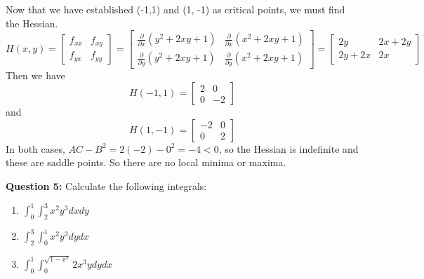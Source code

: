 \documentclass[10pt]{amsart}
\begin{document}
\begin{enumerate}
Now that we have established (-1,1) and (1, -1) as critical points, we must find the Hessian. 
\begin{equation*}
H(x,y) = \left[\begin{array}{rr}
f_{xx} & f_{xy}\\
f_{yx} & f_{yy} \end{array}\right]
= \left[\begin{array}{rr}
\frac{\partial}{\partial x}(y^2 + 2xy +1) & \frac{\partial}{\partial x}(x^2+2xy+1)\\
\frac{\partial}{\partial y}(y^2 +2xy+1) &\frac{\partial}{\partial y}(x^2 +2xy+1) \end{array}\right]
= \left[\begin{array}{rr}
2y & 2x + 2y \\
2y + 2x & 2x \end{array}\right]
\end{equation*}
Then we have $$H(-1,1) = \left[\begin{array}{rr}
2  & 0 \\
0 & -2 \end{array}\right] $$ and $$H(1,-1) = \left[\begin{array}{rr}
-2 & 0 \\
0 & 2 \end{array}\right] $$
In both cases, $AC -  B^2 = 2(-2)-0^2 = -4 < 0$, so the Hessian is indefinite and these are saddle points. So there are no local minima or maxima.
\end{enumerate}
\medskip

\textbf{Question 5:} Calculate the following integrals:
\begin{enumerate}
\item $\int_{0}^1 \int_{2}^{3} x^2y^3 dxdy$
\item $\int_{2}^{3} \int_{0}^1 x^2y^3 dydx$
\item $\int_{0}^1 \int_0^{\sqrt{1-x^2}} 2x^3ydydx$
\end{enumerate}
\end{document}

